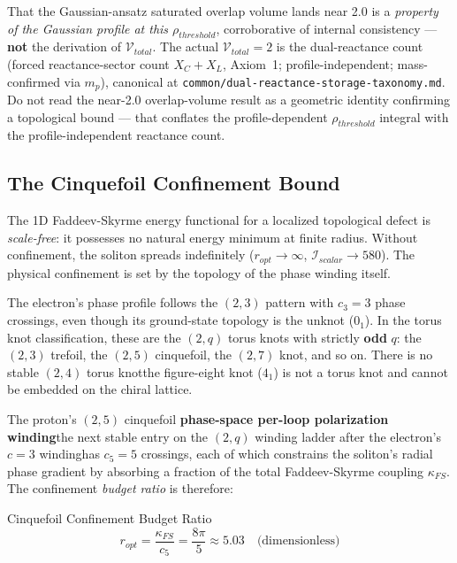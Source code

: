 That the Gaussian-ansatz saturated overlap volume lands near 2.0 is a \emph{property of the Gaussian profile at this $\rho_{threshold}$}, corroborative of internal consistency --- \textbf{not} the derivation of $\mathcal{V}_{total}$. The actual $\mathcal{V}_{total} = 2$ is the dual-reactance count (forced reactance-sector count $X_C + X_L$, Axiom~1; profile-independent; mass-confirmed via $m_p$), canonical at \texttt{common/dual-reactance-storage-taxonomy.md}. Do not read the near-2.0 overlap-volume result as a geometric identity confirming a topological bound --- that conflates the profile-dependent $\rho_{threshold}$ integral with the profile-independent reactance count.

\subsection{The Cinquefoil Confinement Bound}

The 1D Faddeev-Skyrme energy functional for a localized topological defect is \textit{scale-free}: it possesses no natural energy minimum at finite radius. Without confinement, the soliton spreads indefinitely ($r_{opt} \to \infty$, $\mathcal{I}_{scalar} \to 580$). The physical confinement is set by the topology of the phase winding itself.

The electron's phase profile follows the $(2,3)$ pattern with $c_3 = 3$ phase crossings, even though its ground-state topology is the unknot ($0_1$). In the torus knot classification, these are the $(2,q)$ torus knots with strictly \textbf{odd} $q$: the $(2,3)$ trefoil, the $(2,5)$ cinquefoil, the $(2,7)$ knot, and so on. There is no stable $(2,4)$ torus knot\textemdash the figure-eight knot ($4_1$) is not a torus knot and cannot be embedded on the chiral lattice.

The proton's $(2,5)$ cinquefoil \textbf{phase-space per-loop polarization winding}\textemdash the next stable entry on the $(2,q)$ winding ladder after the electron's $c=3$ winding\textemdash has $c_5 = 5$ crossings, each of which constrains the soliton's radial phase gradient by absorbing a fraction of the total Faddeev-Skyrme coupling $\kappa_{FS}$. The confinement \emph{budget ratio} is therefore:
\begin{resultbox}{Cinquefoil Confinement Budget Ratio}
\begin{equation}
    r_{opt} = \frac{\kappa_{FS}}{c_5} = \frac{8\pi}{5} \approx 5.03 \quad \text{(dimensionless)}
\end{equation}
\end{resultbox}


